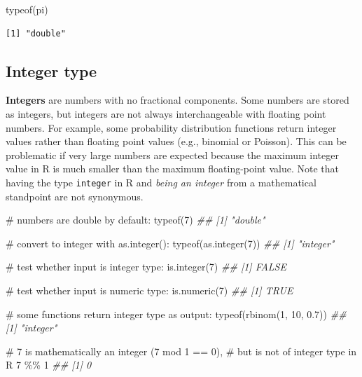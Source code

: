 \documentclass[
  13,
  letterpaper,
]{report}
\newenvironment{Shaded}{\begin{snugshade}}{\end{snugshade}}
\newcommand{\CommentTok}[1]{\textcolor[rgb]{0.37,0.37,0.37}{#1}}
\newcommand{\DecValTok}[1]{\textcolor[rgb]{0.68,0.00,0.00}{#1}}
\newcommand{\DocumentationTok}[1]{\textcolor[rgb]{0.37,0.37,0.37}{\textit{#1}}}
\newcommand{\FloatTok}[1]{\textcolor[rgb]{0.68,0.00,0.00}{#1}}
\newcommand{\FunctionTok}[1]{\textcolor[rgb]{0.28,0.35,0.67}{#1}}
\newcommand{\NormalTok}[1]{\textcolor[rgb]{0.00,0.23,0.31}{#1}}
\newcommand{\SpecialCharTok}[1]{\textcolor[rgb]{0.37,0.37,0.37}{#1}}
\begin{document}
\begin{Shaded}
\begin{Highlighting}[]
\FunctionTok{typeof}\NormalTok{(pi)}
\end{Highlighting}
\end{Shaded}

\begin{verbatim}
[1] "double"
\end{verbatim}

\subsection{Integer type}\label{integer-type}

\textbf{Integers} are numbers with no fractional components. Some
numbers are stored as integers, but integers are not always
interchangeable with floating point numbers. For example, some
probability distribution functions return integer values rather than
floating point values (e.g., binomial or Poisson). This can be
problematic if very large numbers are expected because the maximum
integer value in R is much smaller than the maximum floating-point
value. Note that having the type \texttt{integer} in R and \emph{being
an integer} from a mathematical standpoint are not synonymous.

\begin{Shaded}
\begin{Highlighting}[]
\CommentTok{\# numbers are double by default:}
\FunctionTok{typeof}\NormalTok{(}\DecValTok{7}\NormalTok{)}
\DocumentationTok{\#\# [1] "double"}

\CommentTok{\# convert to integer with as.integer():}
\FunctionTok{typeof}\NormalTok{(}\FunctionTok{as.integer}\NormalTok{(}\DecValTok{7}\NormalTok{))}
\DocumentationTok{\#\# [1] "integer"}

\CommentTok{\# test whether input is integer type:}
\FunctionTok{is.integer}\NormalTok{(}\DecValTok{7}\NormalTok{)}
\DocumentationTok{\#\# [1] FALSE}

\CommentTok{\# test whether input is numeric type:}
\FunctionTok{is.numeric}\NormalTok{(}\DecValTok{7}\NormalTok{)}
\DocumentationTok{\#\# [1] TRUE}

\CommentTok{\# some functions return integer type as output:}
\FunctionTok{typeof}\NormalTok{(}\FunctionTok{rbinom}\NormalTok{(}\DecValTok{1}\NormalTok{, }\DecValTok{10}\NormalTok{, }\FloatTok{0.7}\NormalTok{))}
\DocumentationTok{\#\# [1] "integer"}

\CommentTok{\# 7 is mathematically an integer (7 mod 1 == 0),}
\CommentTok{\# but is not of integer type in R}
\DecValTok{7} \SpecialCharTok{\%\%} \DecValTok{1}
\DocumentationTok{\#\# [1] 0}
\end{Highlighting}
\end{Shaded}
\end{document}
